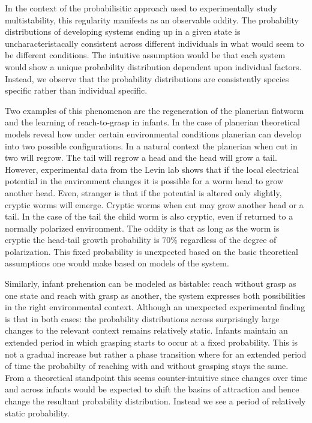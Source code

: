 \documentclass[letterpaper]{article}
\begin{document}
In the context of the probabilisitic approach used to experimentally 
study multistability, this regularity manifests as an observable oddity.
The probability distributions of developing systems ending up in a given
state is uncharacteristacally consistent across different individuals 
in what would seem to be different conditions. The intuitive assumption
would be that each system would show a unique probability distribution
dependent upon individual factors. Instead, we observe that the probability
distributions are consistently species specific rather than individual specific.

Two examples of this phenomenon are the regeneration of the planerian flatworm
and the learning of reach-to-grasp in infants. In the case of planerian
theoretical models reveal how under certain environmental conditions 
planerian can develop into two possible configurations. In a natural context
the planerian when cut in two will regrow. The tail will regrow a head and the
head will grow a tail. However, experimental data from the Levin lab shows that
if the local electrical potential in the environment changes it is possible for 
a worm head to grow another head. Even, stranger is that if the potential
is altered only slightly, cryptic worms will emerge. Cryptic worms when cut 
may grow another head or a tail. In the case of the tail the child worm is 
also cryptic, even if returned to a normally polarized environment. The oddity
is that as long as the worm is cryptic the head-tail growth probability is $70\%$
regardless of the degree of polarization. This fixed probability is unexpected 
based on the basic theoretical assumptions one would make based on models of the
system.

Similarly, infant
prehension can be modeled as bistable: reach without grasp as one state
and reach with grasp as another, the system expresses both possibilities in the right
environmental context. Although an unexpected experimental finding is that in
both cases: the probability distributions across surprisingly large changes
to the relevant context remains relatively static. Infants maintain an extended 
period in which grasping starts to occur at a fixed probability. This is not a gradual
increase but rather a phase transition where for an extended period of time the probabilty
of reaching with and without grasping stays the same.
From a theoretical standpoint this seems 
counter-intuitive since changes over time and across infants would be expected 
to shift the basins of attraction and hence change the resultant probability 
distribution. Instead we see a period of relatively static probability.
\end{document}
